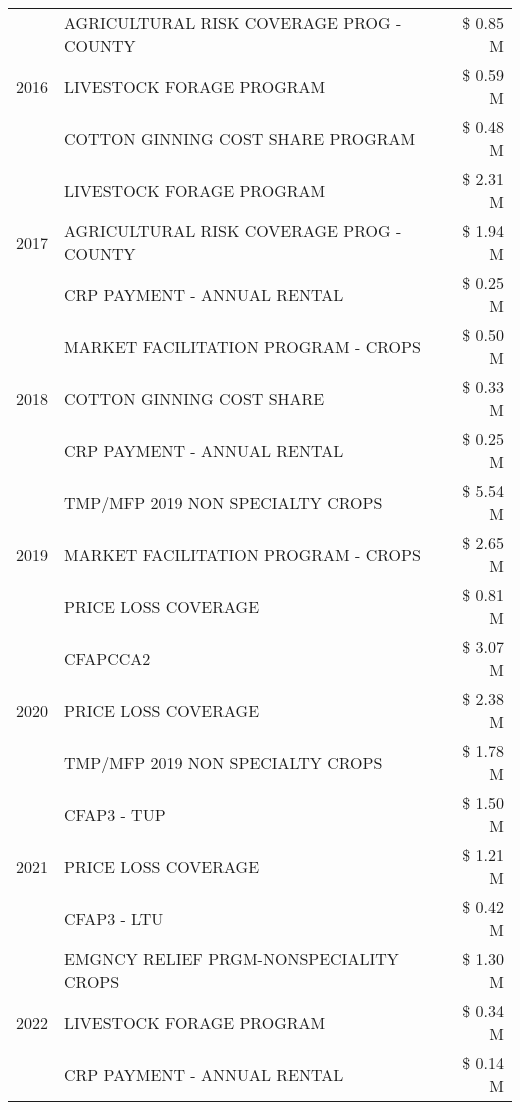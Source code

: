 \begin{tabular}{llr}
\cline{1-3}
\multirow[t]{3}{*}{2016} & AGRICULTURAL RISK COVERAGE PROG - COUNTY & \$ 0.85 M \\
 & LIVESTOCK FORAGE PROGRAM & \$ 0.59 M \\
 & COTTON GINNING COST SHARE PROGRAM & \$ 0.48 M \\
\cline{1-3}
\multirow[t]{3}{*}{2017} & LIVESTOCK FORAGE PROGRAM & \$ 2.31 M \\
 & AGRICULTURAL RISK COVERAGE PROG - COUNTY & \$ 1.94 M \\
 & CRP PAYMENT - ANNUAL RENTAL & \$ 0.25 M \\
\cline{1-3}
\multirow[t]{3}{*}{2018} & MARKET FACILITATION PROGRAM - CROPS & \$ 0.50 M \\
 & COTTON GINNING COST SHARE & \$ 0.33 M \\
 & CRP PAYMENT - ANNUAL RENTAL & \$ 0.25 M \\
\cline{1-3}
\multirow[t]{3}{*}{2019} & TMP/MFP 2019 NON SPECIALTY CROPS & \$ 5.54 M \\
 & MARKET FACILITATION PROGRAM - CROPS & \$ 2.65 M \\
 & PRICE LOSS COVERAGE & \$ 0.81 M \\
\cline{1-3}
\multirow[t]{3}{*}{2020} & CFAPCCA2 & \$ 3.07 M \\
 & PRICE LOSS COVERAGE & \$ 2.38 M \\
 & TMP/MFP 2019 NON SPECIALTY CROPS & \$ 1.78 M \\
\cline{1-3}
\multirow[t]{3}{*}{2021} & CFAP3 - TUP & \$ 1.50 M \\
 & PRICE LOSS COVERAGE & \$ 1.21 M \\
 & CFAP3 - LTU & \$ 0.42 M \\
\cline{1-3}
\multirow[t]{3}{*}{2022} & EMGNCY RELIEF PRGM-NONSPECIALITY CROPS & \$ 1.30 M \\
 & LIVESTOCK FORAGE PROGRAM & \$ 0.34 M \\
 & CRP PAYMENT - ANNUAL RENTAL & \$ 0.14 M \\
\cline{1-3}
\bottomrule
\end{tabular}
